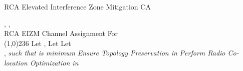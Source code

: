 \documentclass[conference]{IEEEtran}
\begin{document}
\renewcommand{\algorithmicrequire}{\textbf{Input:}}
\renewcommand{\algorithmicensure}{\textbf{Output:}}
\begin{algorithm}[htb!] 
\caption{RCA Elevated Interference Zone Mitigation CA}
\label{MaNI}
\begin{algorithmic}[1]
{\fontsize{9}{10}
\REQUIRE , ,  \\
\ENSURE RCA EIZM Channel Assignment For  \\
\line(1,0){236}
\STATE Let 
\STATE   
{}
\STATE	, 
\FOR	{ }
\FOR	{}
\STATE	
\ENDFOR
\STATE	
\ENDFOR
\FOR	{}
\STATE	 
\FOR 	{}
\IF	{}
\STATE	Let  
\ELSE 
\STATE Let   \\ 
\ENDIF
\STATE	  , \textit{such that}  \textit{is minimum}
\STATE    
\STATE 	  
\ENDFOR
\ENDFOR
\STATE \textit{Ensure Topology Preservation in } 
\STATE \textit{Perform Radio Co-location Optimization in } 
}
\end{algorithmic}
\end{algorithm}
\end{document}
